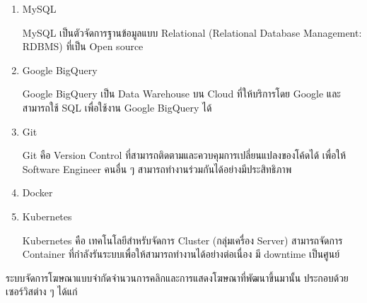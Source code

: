 \begin{enumerate}
	\item MySQL
	
	MySQL เป็นตัวจัดการฐานข้อมูลแบบ Relational (Relational Database Management: RDBMS) ที่เป็น Open source
	
	\item Google BigQuery
	
	Google BigQuery เป็น Data Warehouse บน Cloud ที่ให้บริการโดย Google และสามารถใช้ SQL เพื่อใช้งาน Google BigQuery ได้
	
	\item Git
	
	Git คือ Version Control ที่สามารถติดตามและควบคุมการเปลี่ยนแปลงของโค้ดได้ เพื่อให้ Software Engineer คนอื่น ๆ สามารถทำงานร่วมกันได้อย่างมีประสิทธิภาพ
	
	\item Docker
	
	\item Kubernetes

	Kubernetes คือ เทคโนโลยีสำหรับจัดการ Cluster (กลุ่มเครื่อง Server) สามารถจัดการ Container ที่กำลังรันระบบเพื่อให้สามารถทำงานได้อย่างต่อเนื่อง มี downtime เป็นศูนย์ ~\cite{kubernetes}
	
\end{enumerate}

ระบบจัดการโฆษณาแบบจำกัดจำนวนการคลิกและการแสดงโฆษณาที่พัฒนาขึ้นมานั้น ประกอบด้วยเซอร์วิสต่าง ๆ ได้แก่

